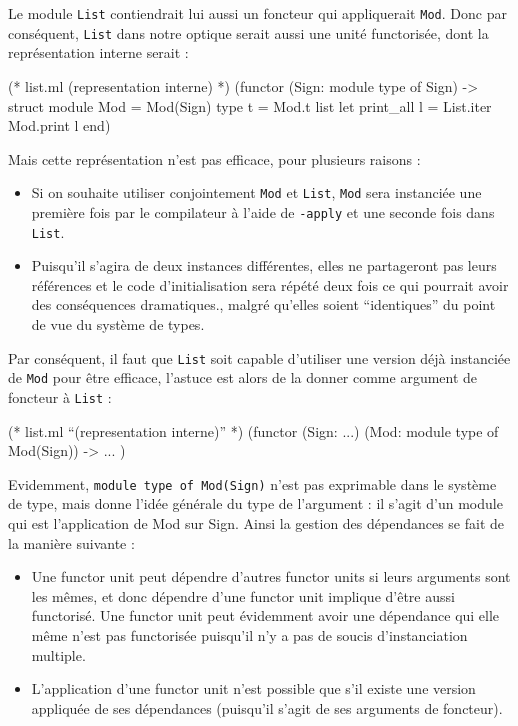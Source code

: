 \documentclass[11pt,a4paper]{report}
\begin{document}
Le module \texttt{List} contiendrait lui aussi un foncteur qui appliquerait
\texttt{Mod}. Donc par conséquent, \texttt{List} dans notre optique serait aussi
une unité functorisée, dont la représentation interne serait :
\begin{OCaml}
(* list.ml (representation interne) *)
(functor (Sign: module type of Sign) ->
  struct
    module Mod = Mod(Sign)
    type t = Mod.t list
    let print_all l = List.iter Mod.print l
  end)
\end{OCaml}
Mais cette représentation n'est pas efficace, pour plusieurs raisons :
\begin{itemize}
\item Si on souhaite utiliser conjointement \texttt{Mod} et \texttt{List},
  \texttt{Mod} sera instanciée une première fois par le compilateur à l'aide de
  \texttt{-apply} et une seconde fois dans \texttt{List}.
\item Puisqu'il s'agira de deux instances différentes, elles ne partageront pas
  leurs références et le code d'initialisation sera répété deux fois ce qui
  pourrait avoir des conséquences dramatiques., malgré qu'elles soient
  ``identiques'' du point de vue du système de types.
\end{itemize}
Par conséquent, il faut que \texttt{List} soit capable d'utiliser une version
déjà instanciée de \texttt{Mod} pour être efficace, l'astuce est alors de la donner
comme argument de foncteur à \texttt{List} :
\begin{OCaml}
(* list.ml ``(representation interne)'' *)
(functor (Sign: ...) (Mod: module type of Mod(Sign)) ->
   ...
)
\end{OCaml}
Evidemment, \lstinline{module type of Mod(Sign)} n'est pas exprimable dans le
système de type, mais donne l'idée générale du type de l'argument : il s'agit
d'un module qui est l'application de Mod sur Sign. Ainsi la gestion des
dépendances se fait de la manière suivante :
\begin{itemize}
\item Une functor unit peut dépendre d'autres functor units si leurs arguments
  sont les mêmes, et donc dépendre d'une functor unit implique d'être aussi
  functorisé. Une functor unit peut évidemment avoir une dépendance qui elle
  même n'est pas functorisée puisqu'il n'y a pas de soucis d'instanciation
  multiple.
\item L'application d'une functor unit n'est possible que s'il existe une
  version appliquée de ses dépendances (puisqu'il s'agit de ses arguments
  de foncteur).
\end{itemize}
\end{document}
